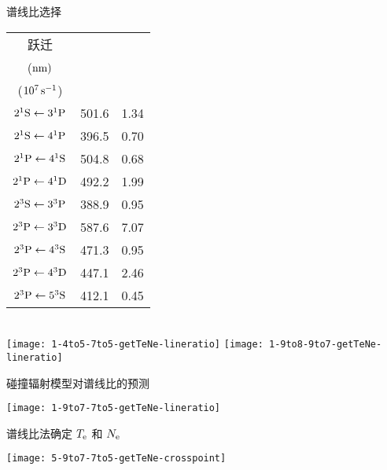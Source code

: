 \begin{frame}{谱线比选择}
	\begin{center}{\tiny
		\begin{tabular}{ccc}\toprule
			跃迁 & \makecell[c]{$\lambda_{q\to p}$\\ (${\rm nm})$} & \makecell[c]{$A_{q\to p}^{\rm eff}$\\ ($10^7\,{\rm s}^{-1}$)}\\
			\hline
			{\color{red}$2^1{\rm S}\leftarrow3^1{\rm P}$} & {\color{red}501.6} & {\color{red}1.34} \\
			{\color{red}$2^1{\rm S}\leftarrow4^1{\rm P}$} & {\color{red}396.5} & {\color{red}0.70} \\
			$2^1{\rm P}\leftarrow4^1{\rm S}$ & 504.8 & 0.68 \\
			$2^1{\rm P}\leftarrow4^1{\rm D}$ & 492.2 & 1.99 \\
			{\color{red}$2^3{\rm S}\leftarrow3^3{\rm P}$} & {\color{red}388.9} & {\color{red}0.95} \\
			$2^3{\rm P}\leftarrow3^3{\rm D}$ & 587.6 & 7.07 \\
			$2^3{\rm P}\leftarrow4^3{\rm S}$ & 471.3 & 0.95 \\
			$2^3{\rm P}\leftarrow4^3{\rm D}$ & 447.1 & 2.46 \\
			{\color{magenta}$2^3{\rm P}\leftarrow5^3{\rm S}$} & {\color{magenta}412.1} & {\color{magenta}0.45} \\
			\bottomrule
		\end{tabular}
		}\\
		{\color{green}}
		\texttt{[image: 1-4to5-7to5-getTeNe-lineratio]}
		\texttt{[image: 1-9to8-9to7-getTeNe-lineratio]}
	\end{center}
\end{frame}

\begin{frame}{碰撞辐射模型对谱线比的预测}
	\vspace{-0.3cm}
	\begin{center}
		\texttt{[image: 1-9to7-7to5-getTeNe-lineratio]}
	\end{center}
\end{frame}

\begin{frame}{谱线比法确定 $T_{\rm e}$ 和 $N_{\rm e}$}
	\vspace{-0.3cm}
	\begin{center}
		\texttt{[image: 5-9to7-7to5-getTeNe-crosspoint]}
	\end{center}
\end{frame}




